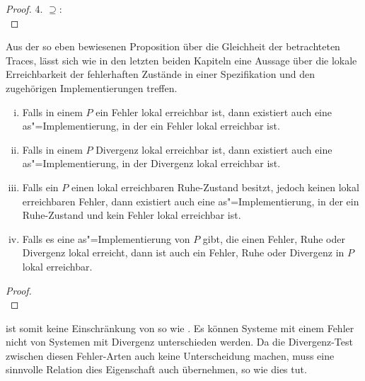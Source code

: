 \begin{proof}
  4. \glqq$\supseteq$\grqq{}:\\
\end{proof}

Aus der so eben bewiesenen Proposition über die Gleichheit der betrachteten
Traces, lässt sich wie in den letzten beiden Kapiteln eine Aussage über die
lokale Erreichbarkeit der \glqq fehlerhaften Zustände\grqq{} in einer
Spezifikation und den zugehörigen Implementierungen treffen.

\begin{Kor}
  \begin{enumerate}[(i)]
    \item Falls in einem \MEIO{} $P$ ein Fehler lokal erreichbar ist, dann
      existiert auch eine as"=Implementierung, in der ein Fehler lokal
      erreichbar ist.
    \item Falls in einem \MEIO{} $P$ Divergenz lokal erreichbar ist, dann
      existiert auch eine as"=Implementierung, in der Divergenz lokal erreichbar
      ist.
    \item Falls ein \MEIO{} $P$ einen lokal erreichbaren Ruhe-Zustand besitzt,
      jedoch keinen lokal erreichbaren Fehler, dann existiert auch eine
      as"=Implementierung, in der ein Ruhe-Zustand und kein Fehler lokal
      erreichbar ist.
    \item Falls es eine as"=Implementierung von $P$ gibt, die einen Fehler,
      Ruhe oder Divergenz lokal erreicht, dann ist auch ein Fehler, Ruhe oder
      Divergenz in $P$ lokal erreichbar.
  \end{enumerate}
\end{Kor}
\begin{proof}\mbox{}\\
\end{proof}

\DRel{} ist somit keine Einschränkung von \ERel{} so wie \QRel{}. Es können
Systeme mit einem Fehler nicht von Systemen mit Divergenz
unterschieden werden. Da die Divergenz-Test zwischen diesen Fehler-Arten auch
keine Unterscheidung machen, muss eine sinnvolle Relation dies Eigenschaft auch
übernehmen, so wie \DRel{} dies tut.

